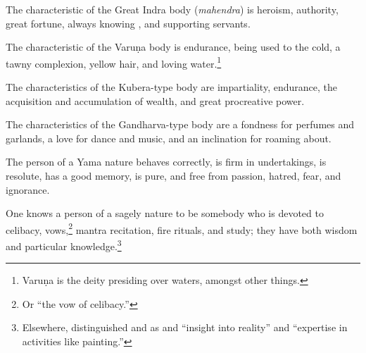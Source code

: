 \begin{translation}
\item[82]

The characteristic of the Great Indra body (\emph{mahendra}) is heroism, authority, great fortune, always knowing , and supporting servants.  

\item[83]

The characteristic of the Varuṇa body is endurance, being used to the
cold, a tawny complexion, yellow hair, and loving
water.\footnote{Varuṇa is the deity presiding over waters, amongst
    other things.}



\item[84]

The characteristics of the Kubera-type body are impartiality,
endurance, the acquisition and accumulation of wealth, and great
procreative power.

\item[85]

The characteristics of the Gandharva-type body are a fondness for
perfumes and garlands,  a love for dance and music, and an inclination
for roaming about.

\item[86]

The person of a Yama nature behaves correctly, is firm in
undertakings, is resolute, has a good memory, is pure, and free from
passion, hatred, fear, and ignorance.

\item[87]

One knows a person of a sagely nature to be somebody who is devoted to celibacy,
vows,\footnote{Or “the vow of celibacy.”} mantra recitation, fire rituals, and
study; they have both wisdom and particular knowledge.\footnote{Elsewhere,
 distinguished  and  as
 and  “insight into reality” and
“expertise in activities like painting.”}

\item[88a]


\end{translation}
